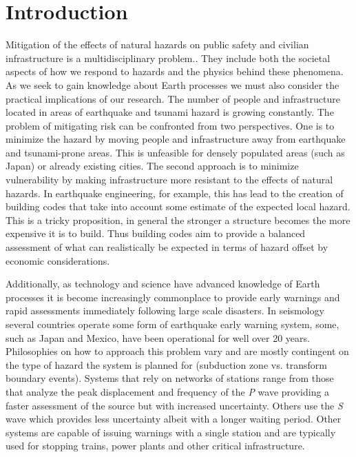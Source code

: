 
\chapter{Introduction}

Mitigation of the effects of natural hazards on public safety and civilian infrastructure is a multidisciplinary problem.. They include both the societal aspects of how we respond to hazards and the physics behind these phenomena. As we seek to gain knowledge about Earth processes we must also consider the practical implications of our research. The number of people and infrastructure located in areas of earthquake and tsunami hazard is growing constantly. The problem of mitigating risk can be confronted from two perspectives. One is to minimize the hazard by moving people and infrastructure away from earthquake and tsunami-prone areas. This is unfeasible for densely populated areas (such as Japan) or already existing cities. The second approach is to minimize vulnerability by making infrastructure more resistant to the effects of natural hazards. In earthquake engineering, for example, this has lead to the creation of building codes that take into account some estimate of the expected local hazard. This is a tricky proposition, in general the stronger a structure becomes the more expensive it is to build. Thus building codes aim to provide a balanced assessment of what can realistically be expected in terms of hazard offset by economic considerations.

Additionally, as technology and science have advanced knowledge of Earth processes it is become increasingly commonplace to provide early warnings and rapid assessments immediately following large scale disasters. In seismology several countries operate some form of earthquake early warning \citep{allen2009} system, some, such as Japan and Mexico, have been operational for well over 20 years. Philosophies on how to approach this problem vary and are mostly contingent on the type of hazard the system is planned for (subduction zone vs. transform boundary events). Systems that rely on networks of stations range from those that analyze the peak displacement and frequency of the \textit{P} wave \citep{kamigaichi2009} providing a faster assessment of the source but with increased uncertainty. Others use the \textit{S} wave \citep{espinosa2009} which provides less uncertainty albeit with a longer waiting period. Other systems are capable of issuing warnings with a single station \citep{nakamura2007} and are typically used for stopping trains, power plants and other critical infrastructure.

